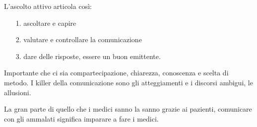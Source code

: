 L'ascolto attivo articola così:

\begin{itemize}
\item[1.]
  ascoltare e capire
\item[2.]
  valutare e controllare la comunicazione
\item[3.]
  dare delle risposte, essere un buon emittente.
\end{itemize}

Importante che ci sia compartecipazione, chiarezza, conoscenza e scelta
di metodo. I killer della comunicazione sono gli atteggiamenti e i
discorsi ambigui, le allusioni.

La gran parte di quello che i medici sanno la sanno grazie ai pazienti,
comunicare con gli ammalati significa imparare a fare i medici.